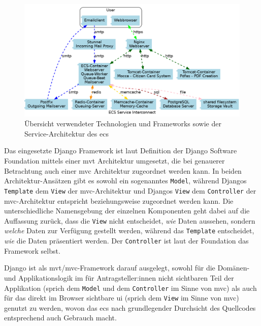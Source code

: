\documentclass[a4paper,12pt,twoside,numbers=noendperiod]{scrreprt}
\begin{document}
\begin{figure}[ht]
    \centering
    \includegraphics[width=\linewidth]{thesis/images/ECS_Service-Architecture.png}
    \caption[Übersicht verwendeter Technologien und Frameworks sowie der Service-Architektur des \acl{ecs}]{Übersicht verwendeter Technologien und Frameworks sowie der Service-Architektur des \acl{ecs} \cite{medizinische_universitat_wien_ecs-handbook_development-2021}}
    \label{fig:ecs-service-architektur}
\end{figure}

Das eingesetzte Django Framework ist laut Definition der Django Software Foundation mittels einer \ac{mvt} Architektur umgesetzt, die bei genauerer Betrachtung auch einer \ac{mvc} Architektur zugeordnet werden kann. In beiden Architektur-Ansätzen gibt es sowohl ein sogenanntes \texttt{Model}, während Djangos \texttt{Template} dem \texttt{View} der \ac{mvc}-Architektur und Djangos \texttt{View} dem \texttt{Controller} der \ac{mvc}-Architektur entspricht beziehungsweise zugeordnet werden kann. Die unterschiedliche Namensgebung der einzelnen Komponenten geht dabei auf die Auffassung zurück, dass die \texttt{View} nicht entscheidet, \textit{wie} Daten aussehen, sondern \textit{welche} Daten zur Verfügung gestellt werden, während das \texttt{Template} entscheidet, \textit{wie} die Daten präsentiert werden. Der \texttt{Controller} ist laut der Foundation das Framework selbst. \cite{django_software_foundation_faq_2023}

\medskip

Django ist als \ac{mvt}/\ac{mvc}-Framework darauf ausgelegt, sowohl für die Domänen- und Applikationslogik im für Antragsteller:innen nicht sichtbaren Teil der Applikation (sprich dem \texttt{Model} und dem \texttt{Controller} im Sinne von \ac{mvc}) als auch für das direkt im Browser sichtbare \ac{ui} (sprich dem \texttt{View} im Sinne von \ac{mvc}) genutzt zu werden, wovon das \ac{ecs} nach grundlegender Durchsicht des Quellcodes entsprechend auch Gebrauch macht. \cite{ethics_commission_system_organization_ecs_2021}
\end{document}
